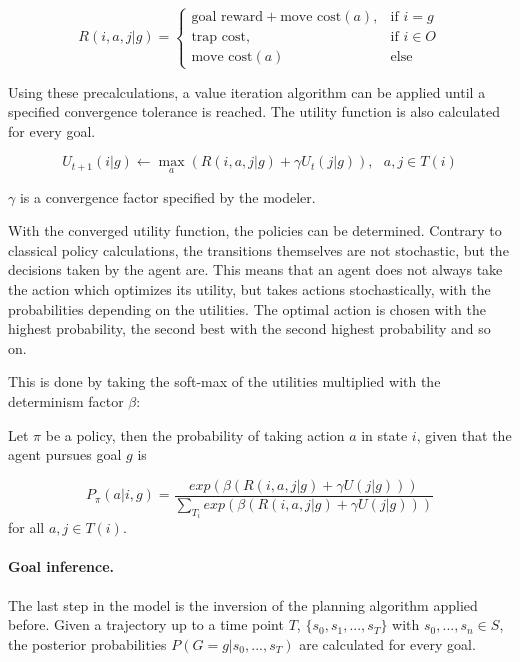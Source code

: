\begin{equation}\label{eq:rewards}
	R(i,a,j | g)= 
	\begin{cases}
		\text{goal reward} + \text{move cost}(a),& \text{if } i = g\\
		\text{trap cost},              & \text{if } i \in O \\
		\text{move cost}(a) & \text{else}
	\end{cases}
\end{equation}%


Using these precalculations, a value iteration algorithm can be applied until a specified convergence tolerance is reached. The utility function is also calculated for every goal.

\begin{equation}
U_{t+1}(i|g) \leftarrow \underset{a}{\max} ( R(i,a,j|g) + \gamma U_t(j|g)  ), ~~~a,j \in T(i)
\end{equation}

$\gamma$ is a convergence factor specified by the modeler.

With the converged utility function, the policies can be determined. Contrary to classical policy calculations, the transitions themselves are not stochastic, but the decisions taken by the agent are.
This means that an agent does not always take the action which optimizes its utility, but takes actions stochastically, with the probabilities depending on the utilities. The optimal action is chosen with the highest probability, the second best with the second highest probability and so on.

This is done by taking the soft-max of the utilities multiplied with the determinism factor $\beta$:

Let $\pi$ be a policy, then the probability of taking action $a$ in state $i$, given that the agent pursues  goal $g$ is

\begin{equation}\label{eq:boltzmann}
P_\pi(a|i,g) = \frac{exp(  \beta(  R(i,a,j|g) + \gamma U(j|g)  )  )}{ \sum_{T_i}  exp(  \beta(  R(i,a,j|g) + \gamma U(j|g)  )  )}
\end{equation}
for all $a,j \in T(i)$.

\paragraph{Goal inference.}
The last step in the model is the inversion of the planning algorithm applied before. 
Given a trajectory up to a time point $T$, $\{ s_0, s_1, ..., s_T  \}$ with $s_0,...,s_n \in S$, the posterior probabilities $P(G=g|s_0,...,s_T)$ are calculated for every goal.

